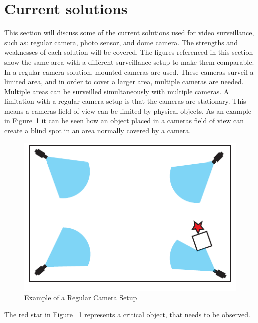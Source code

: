 \section{Current solutions}
This section will discuss some of the current solutions used for video surveillance, such as: regular camera, photo sensor, and dome camera.
The strengths and weaknesses of each solution will be covered.
The figures referenced in this section show the same area with a different surveillance setup to make them comparable. \\

In a regular camera solution, mounted cameras are used.
These cameras surveil a limited area, and in order to cover a larger area, multiple cameras are needed.
Multiple areas can be surveilled simultaneously with multiple cameras.
A limitation with a regular camera setup is that the cameras are stationary.
This means a cameras field of view can be limited by physical objects.
As an example in Figure~\ref{fig:refular_camera_setup} it can be seen how an object placed in a cameras field of view can create a blind spot in an area normally covered by a camera. \\

\begin{figure}[htb]
    \centering
    \includegraphics[width=\textwidth]{gfx/regular_camera_setup.pdf}
    \caption{Example of a Regular Camera Setup}
    \label{fig:refular_camera_setup}
\end{figure}

The red star in Figure ~\ref{fig:refular_camera_setup} represents a critical object, that needs to be observed. \\

